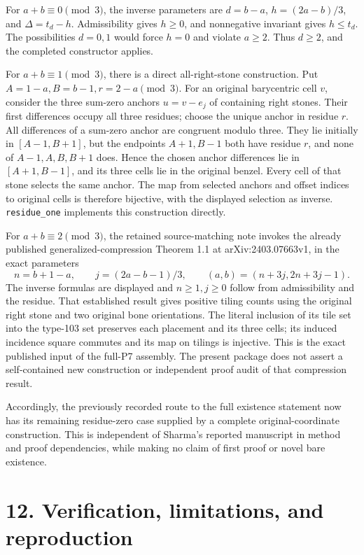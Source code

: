 \documentclass[
  11pt,
]{article}
\begin{document}
For \(a+b\equiv0\pmod3\), the inverse parameters are \(d=b-a\),
\(h=(2a-b)/3\), and \(\Delta=t_d-h\). Admissibility gives \(h\ge0\), and
nonnegative invariant gives \(h\le t_d\). The possibilities \(d=0,1\)
would force \(h=0\) and violate \(a\ge2\). Thus \(d\ge2\), and the
completed constructor applies.

For \(a+b\equiv1\pmod3\), there is a direct all-right-stone
construction. Put \(A=1-a,B=b-1,r=2-a\pmod3\). For an original
barycentric cell \(v\), consider the three sum-zero anchors \(u=v-e_j\)
of containing right stones. Their first differences occupy all three
residues; choose the unique anchor in residue \(r\). All differences of
a sum-zero anchor are congruent modulo three. They lie initially in
\([A-1,B+1]\), but the endpoints \(A+1,B-1\) both have residue \(r\),
and none of \(A-1,A,B,B+1\) does. Hence the chosen anchor differences
lie in \([A+1,B-1]\), and its three cells lie in the original benzel.
Every cell of that stone selects the same anchor. The map from selected
anchors and offset indices to original cells is therefore bijective,
with the displayed selection as inverse. \texttt{residue\_one}
implements this construction directly.

For \(a+b\equiv2\pmod3\), the retained source-matching note invokes the
already published generalized-compression Theorem 1.1 at
arXiv:2403.07663v1, in the exact parameters \[
 n=b+1-a,\qquad j=(2a-b-1)/3,
 \qquad(a,b)=(n+3j,2n+3j-1).
\] The inverse formulas are displayed and \(n\ge1,j\ge0\) follow from
admissibility and the residue. That established result gives positive
tiling counts using the original right stone and two original bone
orientations. The literal inclusion of its tile set into the type-103
set preserves each placement and its three cells; its induced incidence
square commutes and its map on tilings is injective. This is the exact
published input of the full-P7 assembly. The present package does not
assert a self-contained new construction or independent proof audit of
that compression result.

Accordingly, the previously recorded route to the full existence
statement now has its remaining residue-zero case supplied by a complete
original-coordinate construction. This is independent of Sharma's
reported manuscript in method and proof dependencies, while making no
claim of first proof or novel bare existence.

\section{12. Verification, limitations, and
reproduction}\label{verification-limitations-and-reproduction}
\end{document}
